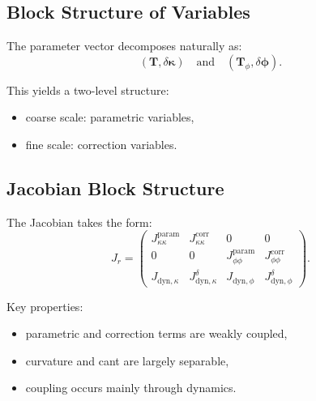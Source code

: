 \subsection{Block Structure of Variables}

\begin{remark}
The parameter vector decomposes naturally as:
\[
(\mathbf{T}, \delta\boldsymbol{\kappa})
\quad \text{and} \quad
(\mathbf{T}_\phi, \delta\boldsymbol{\phi}).
\]
\end{remark}

\begin{remark}
This yields a two-level structure:
\begin{itemize}
\item coarse scale: parametric variables,
\item fine scale: correction variables.
\end{itemize}
\end{remark}

\subsection{Jacobian Block Structure}

\begin{definition}
The Jacobian takes the form:
\[
J_r =
\begin{pmatrix}
J_{\kappa\kappa}^{\mathrm{param}} & J_{\kappa\kappa}^{\mathrm{corr}} & 0 & 0 \\
0 & 0 & J_{\phi\phi}^{\mathrm{param}} & J_{\phi\phi}^{\mathrm{corr}} \\
J_{\mathrm{dyn},\kappa} & J_{\mathrm{dyn},\kappa}^{\delta} &
J_{\mathrm{dyn},\phi} & J_{\mathrm{dyn},\phi}^{\delta}
\end{pmatrix}.
\]
\end{definition}

\begin{remark}
Key properties:
\begin{itemize}
\item parametric and correction terms are weakly coupled,
\item curvature and cant are largely separable,
\item coupling occurs mainly through dynamics.
\end{itemize}
\end{remark}

